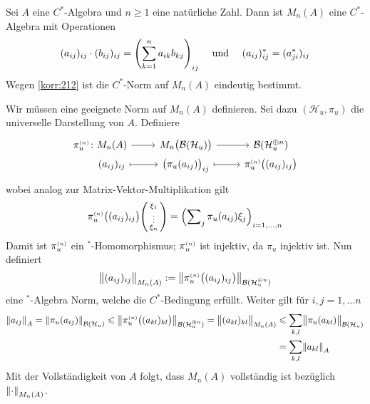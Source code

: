 \begin{korollar}[{name=[Matrizen über einer C^*-Algebra]}]
	Sei $A$ eine $C^*$-Algebra und $n\ge 1$ eine natürliche Zahl.
	Dann ist $M_n(A)$ eine $C^*$-Algebra mit Operationen 
	\[
		(a_{ij})_{ij} \cdot (b_{ij})_{ij} = \enbrace*{\sum_{k=1}^{n} a_{ik} b_{kj}}_{ij} \quad \text{ und } \quad (a_{ij})^*_{ij} = (a_{ji}^*)_{ij}
	\]
	Wegen \autoref{korr:212} ist die $C^*$-Norm auf $M_n(A)$ eindeutig bestimmt.
\end{korollar}
\begin{beweis}
	Wir müssen eine geeignete Norm auf $M_n(A)$ definieren.
	Sei dazu $(\mathcal{H}_u,\pi_u)$ die universelle Darstellung von $A$.
	Definiere
	\[
		\begin{tikzcd}[row sep=0pt]
			\pi_u^\ssbrace{n} \colon M_n(A) \rar & M_n \enbrace[\big]{ \mathcal{B} \enbrace*{\mathcal{H}_u}} \rar & \mathcal{B} \enbrace*{\mathcal{H}_u^{\oplus n}} \\
			\mbox{ } \hspace{2em}(a_{ij})_{ij} \rar[mapsto] & \enbrace[\big]{\pi_u(a_{ij})}_{ij} \rar[mapsto] & \pi_u^\ssbrace{n} \enbrace[\big]{(a_{ij})_{ij}}
		\end{tikzcd}
	\]
	wobei analog zur Matrix-Vektor-Multiplikation gilt
	\[
		\pi_u^\ssbrace{n} \enbrace[\big]{(a_{ij})_{ij}} %
		\begin{psmallmatrix}
			\xi_1 \\ \vdots \\ \xi_n
		\end{psmallmatrix}
		= \enbrace*{\sum\nolimits_{j} \pi_u(a_{ij}) \xi_j}_{i=1,\ldots ,n}
	\]
	Damit ist $\pi_u^\ssbrace{n}$ ein $^*$-Homomorphismus; $\pi_u^\ssbrace{n}$ ist injektiv, da $\pi_u$ injektiv ist.
	Nun definiert 
	\[
		\norm[\big]{(a_{ij})_{ij}}_{M_n(A)} := \norm*{\pi_u^\ssbrace{n} \enbrace[\big]{(a_{ij})_{ij}}}_{\mathcal{B} (\mathcal{H}_u^{\oplus n})} 
	\]
	eine $^*$-Algebra Norm, welche die $C^*$-Bedingung erfüllt.
	Weiter gilt für $i,j =1,\ldots n$
	\begin{align}
		\norm*{a_{ij}}_A =  \norm*{\pi_u(a_{ij})}_{\mathcal{B}(\mathcal{H}_u)} \le \norm*{\pi_u^\ssbrace{n} \enbrace[\big]{(a_{kl})_{kl}}}_{\mathcal{B} (\mathcal{H}_u^{\oplus n})}
		= \norm[\big]{(a_{kl})_{kl}}_{M_n(A)} &\le \sum_{k,l} \norm[\big]{\pi_u(a_{kl})}_{\mathcal{B}(\mathcal{H}_u)} \\
		&= \sum_{k,l} \norm*{a_{kl}}_A
	\end{align}
	Mit der Vollständigkeit von $A$ folgt, dass $M_n(A)$ vollständig ist bezüglich $\norm*{\cdot}_{M_n(A)}$.
\end{beweis}

